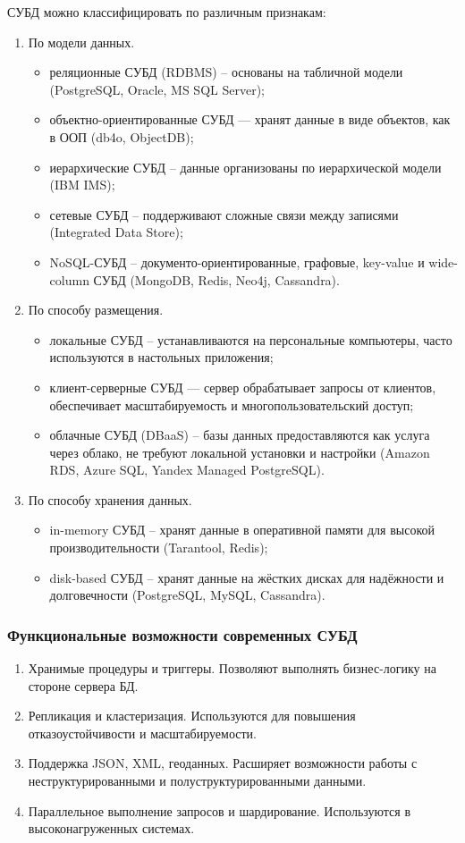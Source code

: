 СУБД можно классифицировать по различным признакам:
\begin{enumerate}
	\item По модели данных.
	\begin{itemize}
		\item реляционные СУБД (RDBMS) -- основаны на табличной модели (PostgreSQL, Oracle, MS SQL Server);
		\item объектно-ориентированные СУБД — хранят данные в виде объектов, как в ООП (db4o, ObjectDB);
		\item иерархические СУБД -- данные организованы по иерархической модели (IBM IMS);
		\item сетевые СУБД -- поддерживают сложные связи между записями (Integrated Data Store);
		\item NoSQL-СУБД -- документо-ориентированные, графовые, key-value и wide-column СУБД (MongoDB, Redis, Neo4j, Cassandra).
	\end{itemize}
	\item По способу размещения.
	\begin{itemize}
		\item локальные СУБД -- устанавливаются на персональные компьютеры, часто используются в настольных приложения;
		\item клиент-серверные СУБД — сервер обрабатывает запросы от клиентов, обеспечивает масштабируемость и многопользовательский доступ;
		\item облачные СУБД (DBaaS) -- базы данных предоставляются как услуга через облако, не требуют локальной установки и настройки (Amazon RDS, Azure SQL, Yandex Managed PostgreSQL).
	\end{itemize}
	\item По способу хранения данных.
	\begin{itemize}
		\item in-memory СУБД -- хранят данные в оперативной памяти для высокой производительности (Tarantool, Redis);
		\item disk-based СУБД -- хранят данные на жёстких дисках для надёжности и долговечности (PostgreSQL, MySQL, Cassandra).		
	\end{itemize}
\end{enumerate}

\subsubsection{Функциональные возможности современных СУБД}

\begin{enumerate}
	\item Хранимые процедуры и триггеры. Позволяют выполнять бизнес-логику на стороне сервера БД.
	\item Репликация и кластеризация. Используются для повышения отказоустойчивости и масштабируемости.
	\item Поддержка JSON, XML, геоданных. Расширяет возможности работы с неструктурированными и полуструктурированными данными.
	\item Параллельное выполнение запросов и шардирование. Используются в высоконагруженных системах.
\end{enumerate}

